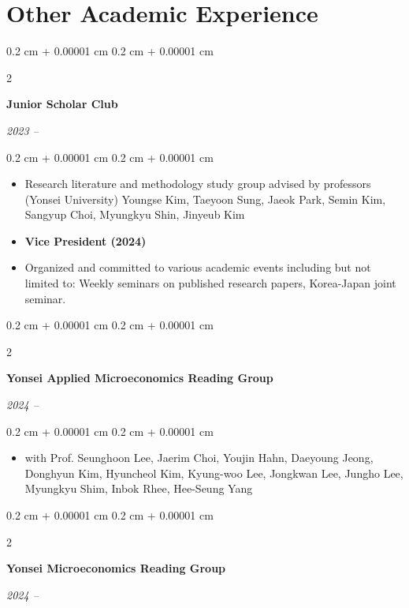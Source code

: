 \documentclass[10pt, letterpaper]{article}
\newenvironment{highlights}{
	\begin{itemize}[
		topsep=0.10 cm,
		parsep=0.10 cm,
		partopsep=0pt,
		itemsep=0pt,
		leftmargin=0.4 cm + 10pt
		]
	}{
	\end{itemize}
} %
\newenvironment{onecolentry}{
	\begin{adjustwidth}{
			0.2 cm + 0.00001 cm
		}{
			0.2 cm + 0.00001 cm
		}
	}{
	\end{adjustwidth}
} %
\newenvironment{twocolentry}[2][]{
	\onecolentry
	\def\secondColumn{#2}
	\setcolumnwidth{\fill, 4.5 cm}
	\begin{paracol}{2}
	}{
		\switchcolumn \raggedleft \secondColumn
	\end{paracol}
	\endonecolentry
} %
\begin{document}
	
\section{Other Academic Experience}
	
	\begin{twocolentry}{
			
			
			\textit{2023 –}}
		\textbf{Junior Scholar Club}
	\end{twocolentry}
	
	\vspace{0.10 cm}
	\begin{onecolentry}
	\begin{highlights}
		\item Research literature and methodology study group advised by professors (Yonsei University) Youngse Kim, Taeyoon Sung, Jaeok Park, Semin Kim, Sangyup Choi, Myungkyu Shin, Jinyeub Kim
		\item \textbf{Vice President (2024)}
		\item Organized and committed to various academic events including but not limited to: Weekly seminars on published research papers, Korea-Japan
		joint seminar.
	\end{highlights}
\end{onecolentry}
	
	
	\vspace{0.2 cm}
	
	\begin{twocolentry}{
			
			
			\textit{2024 –}}
		\textbf{Yonsei Applied Microeconomics Reading Group}
	\end{twocolentry}
	
	\vspace{0.10 cm}
	\begin{onecolentry}
		\begin{highlights}
\item with Prof. Seunghoon Lee, Jaerim Choi, Youjin Hahn, Daeyoung Jeong, Donghyun Kim, Hyuncheol Kim, Kyung-woo Lee, Jongkwan Lee, Jungho Lee, Myungkyu Shim, Inbok Rhee, Hee-Seung Yang
		\end{highlights}
	\end{onecolentry}
	
		\vspace{0.2 cm}
	
	
	\begin{twocolentry}{
			
			
			\textit{2024 –}}
		\textbf{Yonsei Microeconomics Reading Group}
	\end{twocolentry}
	
\end{document}
